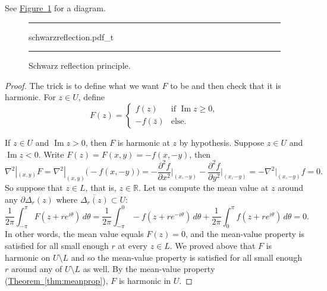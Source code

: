 \documentclass[12pt,openany]{book}
\renewcommand{\Im}{\operatorname{Im}}
\newcommand{\R}{{\mathbb{R}}}
\theoremstyle{plain}
\theoremstyle{remark}
\theoremstyle{definition}
\newenvironment{myfig}{%
\begin{figure}[h!t]
\noindent\rule{\textwidth}{0.5pt}\vspace{12pt}\par\centering}%
{\par\noindent\rule{\textwidth}{0.5pt}
\end{figure}}
\theoremstyle{exercise}
\theoremstyle{example}
\newcommand{\figureref}[1]{\hyperref[#1]{Figure~\ref*{#1}}}
\newcommand{\thmref}[1]{\hyperref[#1]{Theorem~\ref*{#1}}}
\begin{document}
See \figureref{fig:schwarzreflection} for a diagram.

\begin{myfig}
{schwarzreflection.pdf_t}
\caption{Schwarz reflection principle.\label{fig:schwarzreflection}}
\end{myfig}

\begin{proof}
The trick is to define what we want $F$ to be and then
check that it is harmonic.
For $z \in U$, define
\begin{equation*}
F(z) =
\begin{cases}
f(z) & \text{if } \Im z \geq 0, \\
-f(\bar{z}) & \text{else} .
\end{cases}
\end{equation*}

If $z \in U$ and $\Im z > 0$, then $F$ is harmonic at $z$ by hypothesis.
Suppose $z \in U$ and $\Im z < 0$.  Write $F(z) = F(x,y) = -f(x,-y)$, then
\begin{equation*}
\nabla^2|_{(x,y)} F
=
\nabla^2|_{(x,y)} \bigl( -f(x,-y) \bigr)
=
- \frac{\partial^2 f}{\partial x^2}\Big|_{(x,-y)}
- \frac{\partial^2 f}{\partial y^2}\Big|_{(x,-y)}
=
- \nabla^2|_{(x,-y)} f = 0 .
\end{equation*}
So suppose that $z \in L$, that is, $z \in \R$.
Let us compute the mean value at $z$ around any
$\partial \Delta_r(z)$ where $\overline{\Delta_r(z)} \subset U$:
\begin{equation*}
\frac{1}{2\pi} \int_{-\pi}^{\pi} F(z+re^{i\theta})\, d\theta
=
\frac{1}{2\pi} \int_{-\pi}^{0} -f(z+re^{-i\theta})\, d\theta
+
\frac{1}{2\pi} \int_{0}^{\pi} f(z+re^{i\theta})\, d\theta
=
0 .
\end{equation*}
In other words, the mean value equals $F(z) = 0$,
and the mean-value property is satisfied for all small enough
$r$ at every $z \in L$.
We proved above that $F$ is harmonic on $U \setminus L$ and
so the mean-value property
is satisfied for all small enough
$r$ around any of $U \setminus L$ as well.
By the mean-value property (\thmref{thm:meanprop}), $F$ is harmonic in $U$.
\end{proof}
\end{document}
